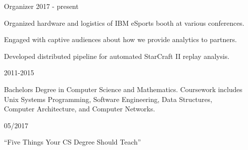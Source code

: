 \documentclass[12pt]{article} %
\begin{document}

\begin{description}
\squish
{}
           {Organizer}
           {2017 - present}

Organized hardware and logistics of IBM eSports booth at various conferences.

Engaged with captive audiences about how we provide analytics to partners.

Developed distributed pipeline for automated StarCraft II replay analysis.

\end{description}


\begin{description}
\squish
{}
           {}
           {2011-2015}

Bachelors Degree in Computer Science and Mathematics. Coursework includes \\
Unix Systems Programming, Software Engineering, Data Structures, \\
Computer Architecture, and Computer Networks.

\end{description}


\begin{description}
\squish

           {}
           {05/2017}

    ``Five Things Your CS Degree Should Teach''

\end{description}
\end{document}
